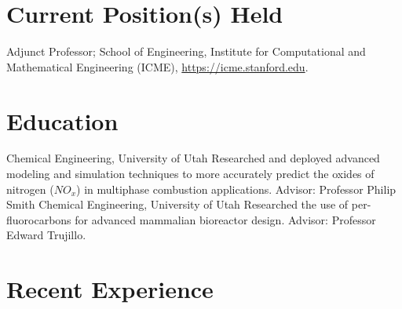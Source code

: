\documentclass[letterpaper]{twentysecondcv_spd} %
\begin{document}
\section{Current Position(s) Held}

\begin{twentyshort}

	
  	 {Adjunct Professor; School of Engineering, Institute for Computational and Mathematical Engineering (ICME), \underline{https://icme.stanford.edu}.}
	
  \end{twentyshort}
  
\section{Education}

\begin{twenty}
	 {\normalfont Chemical Engineering, University of Utah} {Researched and deployed advanced
modeling and simulation techniques to more accurately predict the oxides of nitrogen ($NO_x$) in multiphase combustion applications. Advisor: Professor Philip Smith}
	 {\normalfont Chemical Engineering, University of Utah} {Researched the use of per-fluorocarbons for advanced mammalian bioreactor design. Advisor: Professor Edward Trujillo.}
	
\end{twenty}

\section{Recent Experience}
\end{document}

